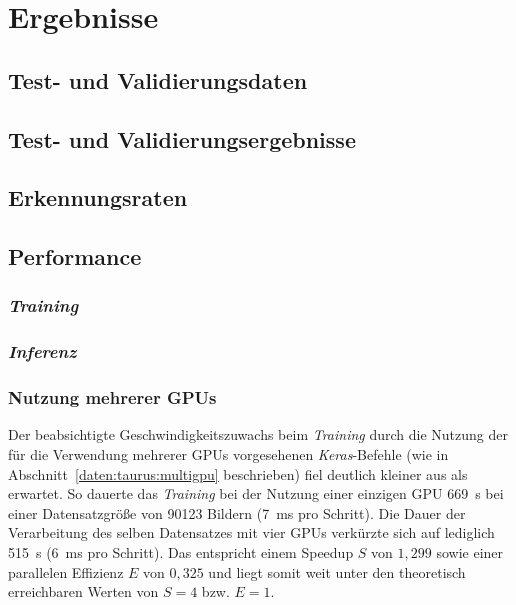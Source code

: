 \section{Ergebnisse}

\subsection{Test- und Validierungsdaten}

\subsection{Test- und Validierungsergebnisse}

\subsection{Erkennungsraten}

\subsection{Performance}

\subsubsection{\textit{Training}}

\subsubsection{\textit{Inferenz}}

\subsubsection{Nutzung mehrerer GPUs}

Der beabsichtigte Geschwindigkeitszuwachs beim \textit{Training} durch die Nutzung der für die Verwendung mehrerer GPUs
vorgesehenen \textit{Keras}-Befehle (wie in Abschnitt~\ref{daten:taurus:multigpu} beschrieben) fiel deutlich kleiner aus
als erwartet. So dauerte das \textit{Training} bei der Nutzung einer einzigen GPU \SI{669}{\second} bei einer
Datensatzgröße von 90123 Bildern (\SI{7}{\milli\second} pro Schritt). Die Dauer der Verarbeitung des selben Datensatzes
mit vier GPUs verkürzte sich auf lediglich \SI{515}{\second} (\SI{6}{\milli\second} pro Schritt). Das entspricht einem
Speedup $S$ von $1,299$ sowie einer parallelen Effizienz $E$ von $0,325$ und liegt somit weit unter den theoretisch
erreichbaren Werten von $S = 4$ bzw. $E = 1$.

